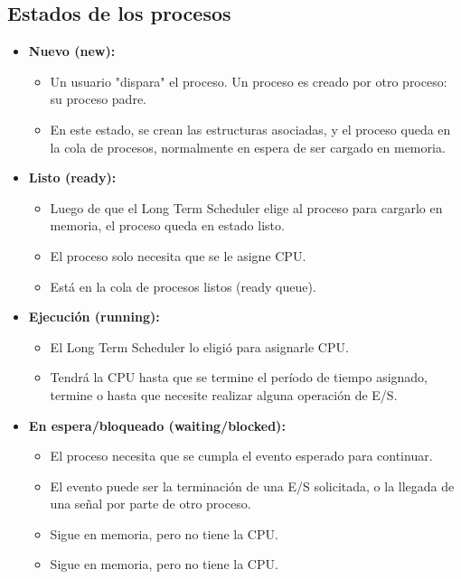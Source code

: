 \subsection{Estados de los procesos}
\begin{itemize}
    \item \textbf{Nuevo (new):}
        \begin{itemize}
            \item Un usuario "dispara" el proceso. Un proceso es creado por otro proceso: su proceso padre.
            \item En este estado, se crean las estructuras asociadas, y el proceso queda en la cola de procesos, normalmente en espera de ser cargado en memoria.
        \end{itemize}
    \item \textbf{Listo (ready):}
        \begin{itemize}
            \item Luego de que el Long Term Scheduler elige al proceso para cargarlo en memoria, el proceso queda en estado listo.
            \item El proceso solo necesita que se le asigne CPU.
            \item Está en la cola de procesos listos (ready queue).
        \end{itemize}
    \item \textbf{Ejecución (running):}
        \begin{itemize}
            \item El Long Term Scheduler lo eligió para asignarle CPU.
            \item Tendrá la CPU hasta que se termine el período de tiempo asignado, termine o hasta que necesite realizar alguna operación de E/S.
        \end{itemize}
    \item \textbf{En espera/bloqueado (waiting/blocked):}
    \begin{itemize}
        \item El proceso necesita que se cumpla el evento esperado para continuar.
        \item El evento puede ser la terminación de una E/S solicitada, o la llegada de una señal por parte de otro proceso.
        \item Sigue en memoria, pero no tiene la CPU.
        \item Sigue en memoria, pero no tiene la CPU.
    \end{itemize}
\end{itemize}

